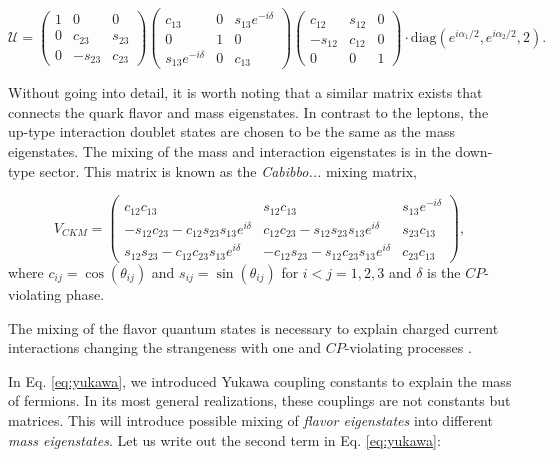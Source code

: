 \begin{equation}
\mathcal{U} = \begin{pmatrix}
1 	& 0 		& 0 \\
0 	& c_{23}	& s_{23} \\
0	& -s_{23} 	& c_{23}
\end{pmatrix}
\begin{pmatrix}
c_{13} 				& 0 		& s_{13}e^{-i\delta} \\
0 					& 1			& 0 \\
s_{13}e^{-i\delta}	& 0 		& c_{13}
\end{pmatrix}
\begin{pmatrix}
c_{12} 	& s_{12}	& 0 \\
-s_{12} & c_{12}	& 0 \\
0		& 0			& 1
\end{pmatrix}
\cdot \textrm{diag}\left(e^{i\alpha_1/2},e^{i\alpha_2/2},2\right).
\end{equation}


\noindent Without going into detail, it is worth noting that a similar matrix exists that connects the quark flavor and mass eigenstates. In contrast to the leptons, the up-type interaction doublet states are chosen to be the same as the mass eigenstates. The mixing of the mass and interaction eigenstates is in the down-type sector. This matrix is known as the \textit{Cabibbo...} mixing matrix, 


\begin{equation}
V_{CKM} = \begin{pmatrix}
c_{12}c_{13} & s_{12}c_{13} & s_{13}e^{-i\delta} \\
-s_{12}c_{23} - c_{12}s_{23}s_{13} e^{i\delta} & c_{12}c_{23} - s_{12}s_{23}s_{13}e^{i\delta} & s_{23}c_{13} \\
s_{12}s_{23} - c_{12}c_{23}s_{13}e^{i\delta} 
& -c_{12}s_{23} - s_{12}c_{23}s_{13}e^{i\delta} & c_{23}c_{13}
\end{pmatrix},
\end{equation}
where $c_{ij} = \cos\left(\theta_{ij}\right)$ and  $s_{ij} = \sin\left(\theta_{ij}\right)$ for $i<j = 1,2,3$ and $\delta$ is the $CP$-violating phase.

\noindent The mixing of the flavor quantum states is necessary to explain charged current interactions changing the strangeness with one \cite{Glashow:1970gm} and $CP$-violating processes \cite{1964PhRvL}.
\fi

In Eq. \ref{eq:yukawa}, we introduced Yukawa coupling constants to explain the mass of fermions. In its most general realizations, these couplings are not constants but matrices. This will introduce possible mixing of \textit{flavor eigenstates} into different \textit{mass eigenstates}. Let us write out the second term in Eq. \ref{eq:yukawa}:

